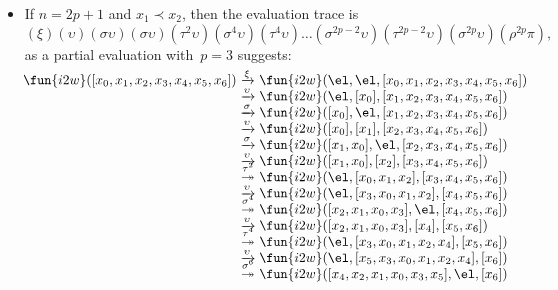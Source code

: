 \begin{itemize}

\item If \(n = 2p+1\) and \(x_1 \prec x_2\), then the evaluation trace
  is
    \begin{equation*}
    (\xi)(\upsilon)(\sigma\upsilon)(\sigma\upsilon)
    (\tau^2\upsilon)(\sigma^4\upsilon)(\tau^4\upsilon) \ldots
    (\sigma^{2p-2}\upsilon)(\tau^{2p-2}\upsilon)(\sigma^{2p}\upsilon)
    (\rho^{2p}\pi),
    \end{equation*}
    as a partial evaluation with~\(p=3\) suggests:
    \begin{equation*}
      \!\begin{array}{@{}r@{\;}c@{\;}l@{}}
        \fun{i2w}([x_0,x_1,x_2,x_3,x_4,x_5,x_6])
        & \xrightarrow{\smash{\xi}}
        & \fun{i2w}(\el,\el,[x_0,x_1,x_2,x_3,x_4,x_5,x_6])\\
        & \xrightarrow{\smash{\upsilon}}
        & \fun{i2w}(\el,[x_0],[x_1,x_2,x_3,x_4,x_5,x_6])\\
        & \xrightarrow{\smash{\sigma}}
        & \fun{i2w}([x_0],\el,[x_1,x_2,x_3,x_4,x_5,x_6])\\
        & \xrightarrow{\smash{\upsilon}}
        & \fun{i2w}([x_0],[x_1],[x_2,x_3,x_4,x_5,x_6])\\
        & \xrightarrow{\smash{\sigma}}
        & \fun{i2w}([x_1,x_0],\el,[x_2,x_3,x_4,x_5,x_6])\\
        & \xrightarrow{\smash{\upsilon}}
        & \fun{i2w}([x_1,x_0],[x_2],[x_3,x_4,x_5,x_6])\\
        & \stackrel{\smash{\tau^{\smash{2}}}}{\twoheadrightarrow}
        & \fun{i2w}(\el,[x_0,x_1,x_2],[x_3,x_4,x_5,x_6])\\
        & \xrightarrow{\smash{\upsilon}}
        & \fun{i2w}(\el,[x_3,x_0,x_1,x_2],[x_4,x_5,x_6])\\
        & \stackrel{\smash{\sigma^{\smash{4}}}}{\twoheadrightarrow}
        & \fun{i2w}([x_2,x_1,x_0,x_3],\el,[x_4,x_5,x_6])\\
        & \xrightarrow{\smash{\upsilon}}
        & \fun{i2w}([x_2,x_1,x_0,x_3],[x_4],[x_5,x_6])\\
        & \stackrel{\smash{\tau^{\smash{4}}}}{\twoheadrightarrow}
        & \fun{i2w}(\el,[x_3,x_0,x_1,x_2,x_4],[x_5,x_6])\\
        & \xrightarrow{\smash{\upsilon}}
        & \fun{i2w}(\el,[x_5,x_3,x_0,x_1,x_2,x_4],[x_6])\\
        & \stackrel{\smash{\sigma^{\smash{6}}}}{\twoheadrightarrow}
        & \fun{i2w}([x_4,x_2,x_1,x_0,x_3,x_5],\el,[x_6])\\

\end{array}
\end{equation*}
\end{itemize}
